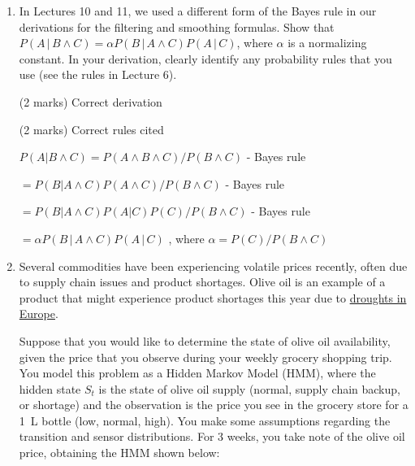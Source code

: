 \documentclass[12pt]{article}
\begin{document}
\begin{enumerate}[font=\Large,label=(\alph*)]

\item
In Lectures 10 and 11, we used a different form of the Bayes rule in our derivations for the filtering and smoothing formulas. Show that $P(A\,|\,B \land C) = \alpha P(B\,|\,A \land C) P(A\,|\,C)$, where $\alpha$ is a normalizing constant. In your derivation, clearly identify any probability rules that you use (see the rules in Lecture 6).

\begin{markscheme}

(2 marks) Correct derivation

(2 marks) Correct rules cited

\end{markscheme}

\begin{sol}
    {\color{blue} 

        $P(A|B \land C) = P(A \land B \land C)/P(B \land C)$ - Bayes rule  

        $ = P(B| A \land C) P(A \land C) /P(B \land C)$ - Bayes rule  

        $ = P(B| A \land C) P(A|C) P(C) /P(B \land C)$ - Bayes rule  

        $ = \alpha P(B\,|\,A \land C) P(A\,|\,C)$ , where $\alpha  = P(C) /P(B \land C) $

    }   
    \end{sol}

\item
Several commodities have been experiencing volatile prices recently, often due to supply chain issues and product shortages. Olive oil is an example of a product that might experience product shortages this year due to \href{https://www.cnn.com/interactive/2022/09/business/olive-oil-shortage-drought-cnnphotos/}{droughts in Europe}.

Suppose that you would like to determine the state of olive oil availability, given the price that you observe during your weekly grocery shopping trip. You model this problem as a Hidden Markov Model (HMM), where the hidden state $S_t$ is the state of olive oil supply (normal, supply chain backup, or shortage) and the observation is the price you see in the grocery store for a \SI{1}{L} bottle (low, normal, high). You make some assumptions regarding the transition and sensor distributions. For 3 weeks, you take note of the olive oil price, obtaining the HMM shown below:


\end{enumerate}
\end{document}

